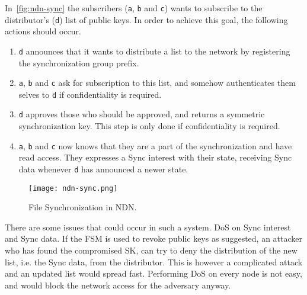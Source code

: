 In~\autoref{fig:ndn-sync} the subscribers (\texttt{a}, \texttt{b} and \texttt{c}) wants to subscribe to the distributor's (\texttt{d}) list of public keys.
In order to achieve this goal, the following actions should occur.
\begin{enumerate}
	\item \texttt{d} announces that it wants to distribute a list to the network by registering the synchronization group prefix. 
	\item \texttt{a}, \texttt{b} and \texttt{c} ask for subscription to this list, and somehow authenticates them selves to \texttt{d} if confidentiality is required.
	\item \texttt{d} approves those who should be approved, and returns a symmetric synchronization key. 
	This step is only done if confidentiality is required.
	\item \texttt{a}, \texttt{b} and \texttt{c} now knows that they are a part of the synchronization and have read access. They expresses a Sync \gls{interest} with their state, receiving Sync \gls{data} whenever \texttt{d} has announced a newer state.
\end{enumerate}

\begin{figure}[ht]
  \centering
  \texttt{[image: ndn-sync.png]}
  \caption{File Synchronization in NDN.}
  \label{fig:ndn-sync}
\end{figure}

There are some issues that could occur in such a system. 
\gls{DoS} on Sync \gls{interest} and Sync \gls{data}. 
If the \gls{FSM} is used to revoke public keys as suggested, an attacker who has found the compromised \gls{SK}, can try to deny the distribution of the new list, i.e. the Sync \gls{data}, from the distributor. 
This is however a complicated attack and an updated list would spread fast.
Performing \gls{DoS} on every node is not easy, and would block the network access for the adversary anyway.
